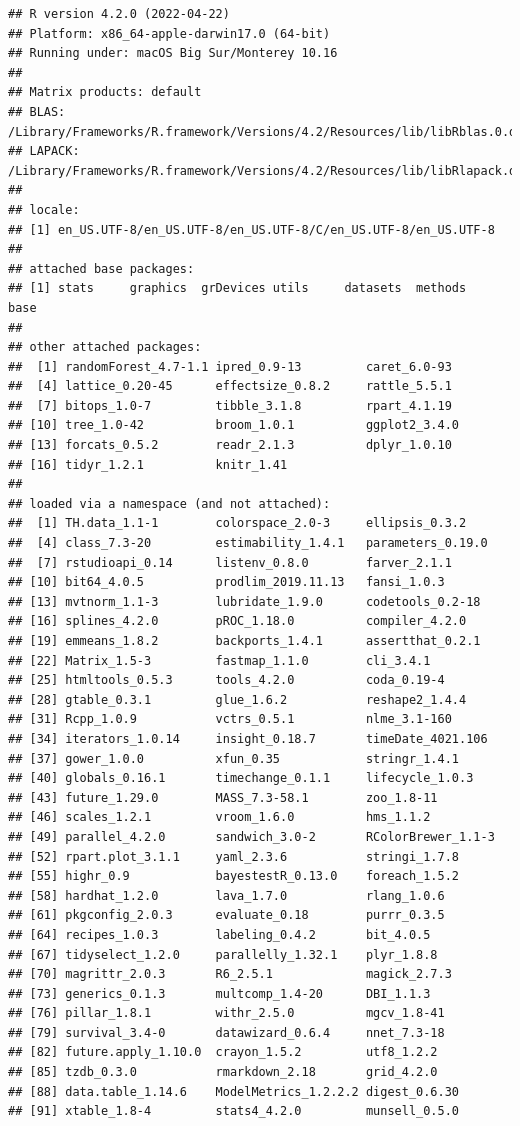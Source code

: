 \documentclass[
]{article}
\begin{document}
\begin{verbatim}
## R version 4.2.0 (2022-04-22)
## Platform: x86_64-apple-darwin17.0 (64-bit)
## Running under: macOS Big Sur/Monterey 10.16
## 
## Matrix products: default
## BLAS:   /Library/Frameworks/R.framework/Versions/4.2/Resources/lib/libRblas.0.dylib
## LAPACK: /Library/Frameworks/R.framework/Versions/4.2/Resources/lib/libRlapack.dylib
## 
## locale:
## [1] en_US.UTF-8/en_US.UTF-8/en_US.UTF-8/C/en_US.UTF-8/en_US.UTF-8
## 
## attached base packages:
## [1] stats     graphics  grDevices utils     datasets  methods   base     
## 
## other attached packages:
##  [1] randomForest_4.7-1.1 ipred_0.9-13         caret_6.0-93        
##  [4] lattice_0.20-45      effectsize_0.8.2     rattle_5.5.1        
##  [7] bitops_1.0-7         tibble_3.1.8         rpart_4.1.19        
## [10] tree_1.0-42          broom_1.0.1          ggplot2_3.4.0       
## [13] forcats_0.5.2        readr_2.1.3          dplyr_1.0.10        
## [16] tidyr_1.2.1          knitr_1.41          
## 
## loaded via a namespace (and not attached):
##  [1] TH.data_1.1-1        colorspace_2.0-3     ellipsis_0.3.2      
##  [4] class_7.3-20         estimability_1.4.1   parameters_0.19.0   
##  [7] rstudioapi_0.14      listenv_0.8.0        farver_2.1.1        
## [10] bit64_4.0.5          prodlim_2019.11.13   fansi_1.0.3         
## [13] mvtnorm_1.1-3        lubridate_1.9.0      codetools_0.2-18    
## [16] splines_4.2.0        pROC_1.18.0          compiler_4.2.0      
## [19] emmeans_1.8.2        backports_1.4.1      assertthat_0.2.1    
## [22] Matrix_1.5-3         fastmap_1.1.0        cli_3.4.1           
## [25] htmltools_0.5.3      tools_4.2.0          coda_0.19-4         
## [28] gtable_0.3.1         glue_1.6.2           reshape2_1.4.4      
## [31] Rcpp_1.0.9           vctrs_0.5.1          nlme_3.1-160        
## [34] iterators_1.0.14     insight_0.18.7       timeDate_4021.106   
## [37] gower_1.0.0          xfun_0.35            stringr_1.4.1       
## [40] globals_0.16.1       timechange_0.1.1     lifecycle_1.0.3     
## [43] future_1.29.0        MASS_7.3-58.1        zoo_1.8-11          
## [46] scales_1.2.1         vroom_1.6.0          hms_1.1.2           
## [49] parallel_4.2.0       sandwich_3.0-2       RColorBrewer_1.1-3  
## [52] rpart.plot_3.1.1     yaml_2.3.6           stringi_1.7.8       
## [55] highr_0.9            bayestestR_0.13.0    foreach_1.5.2       
## [58] hardhat_1.2.0        lava_1.7.0           rlang_1.0.6         
## [61] pkgconfig_2.0.3      evaluate_0.18        purrr_0.3.5         
## [64] recipes_1.0.3        labeling_0.4.2       bit_4.0.5           
## [67] tidyselect_1.2.0     parallelly_1.32.1    plyr_1.8.8          
## [70] magrittr_2.0.3       R6_2.5.1             magick_2.7.3        
## [73] generics_0.1.3       multcomp_1.4-20      DBI_1.1.3           
## [76] pillar_1.8.1         withr_2.5.0          mgcv_1.8-41         
## [79] survival_3.4-0       datawizard_0.6.4     nnet_7.3-18         
## [82] future.apply_1.10.0  crayon_1.5.2         utf8_1.2.2          
## [85] tzdb_0.3.0           rmarkdown_2.18       grid_4.2.0          
## [88] data.table_1.14.6    ModelMetrics_1.2.2.2 digest_0.6.30       
## [91] xtable_1.8-4         stats4_4.2.0         munsell_0.5.0
\end{verbatim}
\end{document}
